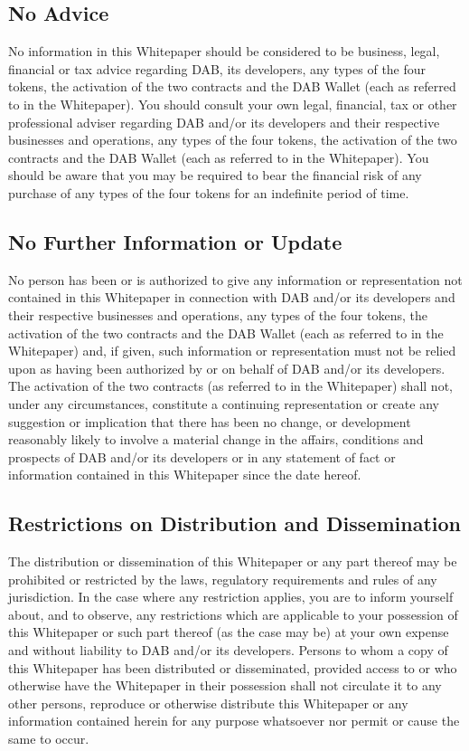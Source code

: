 \documentclass[review]{elsarticle}
\begin{document}
\subsection{No Advice}
No information in this Whitepaper should be considered to be business, legal, financial or tax advice regarding DAB, its developers, any types of the four tokens, the activation of the two contracts and the DAB Wallet (each as referred to in the Whitepaper). You should consult your own legal, financial, tax or other professional adviser regarding DAB and/or its developers and their respective businesses and operations, any types of the four tokens, the activation of the two contracts and the DAB Wallet (each as referred to in the Whitepaper). You should be aware that you may be required to bear the financial risk of any purchase of any types of the four tokens for an indefinite period of time. 

\subsection{No Further Information or Update}
No person has been or is authorized to give any information or representation not contained in this Whitepaper in connection with DAB and/or its developers and their respective businesses and operations, any types of the four tokens, the activation of the two contracts and the DAB Wallet (each as referred to in the Whitepaper) and, if given, such information or representation must not be relied upon as having been authorized by or on behalf of DAB and/or its developers. The activation of the two contracts (as referred to in the Whitepaper) shall not, under any circumstances, constitute a continuing representation or create any suggestion or implication that there has been no change, or development reasonably likely to involve a material change in the affairs, conditions and prospects of DAB and/or its developers or in any statement of fact or information contained in this Whitepaper since the date hereof.

\subsection{Restrictions on Distribution and Dissemination}
The distribution or dissemination of this Whitepaper or any part thereof may be prohibited or restricted by the laws, regulatory requirements and rules of any jurisdiction. In the case where any restriction applies, you are to inform yourself about, and to observe, any restrictions which are applicable to your possession of this Whitepaper or such part thereof (as the case may be) at your own expense and without liability to DAB and/or its developers. 
Persons to whom a copy of this Whitepaper has been distributed or disseminated, provided access to or who otherwise have the Whitepaper in their possession shall not circulate it to any other persons, reproduce or otherwise distribute this Whitepaper or any information contained herein for any purpose whatsoever nor permit or cause the same to occur.
\end{document}
